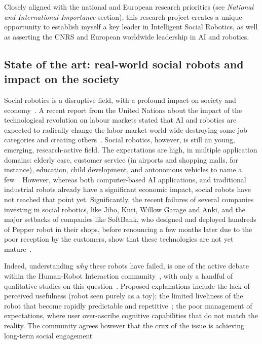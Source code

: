 \begin{framed}
\vspace{0.4em}
\noindent Closely aligned with the national and European research priorities (see
\emph{National and International Importance} section), this research project
creates a unique opportunity to establish myself a key leader in Intelligent
Social Robotics, as well as asserting the CNRS and European worldwide
leadership in AI and robotics.

\end{framed}

\subsection{State of the art: real-world social robots and impact on the
society}

Social robotics is a disruptive field, with a profound impact on society and
economy~\parencite{williams2020social}. A recent report from the United Nations about
the impact of the technological revolution on labour markets stated that AI and
robotics are expected to radically change the labor market world-wide destroying
some job categories and creating others~\parencite{bruckner2017frontier}. Social
robotics, however, is still an young, emerging, research-active field. The
expectations are high, in multiple application domains: elderly care, customer
service (in airports and shopping malls, for instance), education, child
development, and autonomous vehicles to name a few~\parencite{baillie2019challenges}.
However, whereas both computer-based AI applications, and traditional industrial
robots already have a significant economic impact, social robots have not
reached that point yet. Significantly, the recent failures of several companies
investing in social robotics, like Jibo, Kuri, Willow Garage and Anki, and the
major setbacks of companies like SoftBank, who designed and deployed hundreds of
Pepper robot in their shops, before renouncing a few months later due to the poor
reception by the customers, show that these technologies are not yet
mature~\parencite{tulli2019great}.

Indeed, understanding \emph{why} these robots have failed, is one of the
active debate within the Human-Robot Interaction
community~\parencite{hoffman2019anki}, with only a handful of qualitative studies on
this question~\parencite{dereshev2019longterm,degraaf2017phased}. Proposed
explanations include the lack of perceived usefulness (robot seen purely as a
toy); the limited liveliness of the robot that become rapidly predictable and
repetitive~\parencite{lemaignan2014cognitive}; the poor management of expectations,
where user over-ascribe cognitive capabilities that do not match the reality.
The community agrees however that the crux of the issue is achieving long-term
social engagement~\parencite{yang2018grand,hoffman2019anki}

